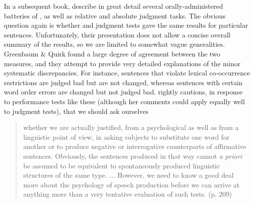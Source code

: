 In a subsequent book, \citet{GreenbaumEtAl1970} describe in great detail several orally-administered batteries of , as well as relative and
absolute judgment tasks. The obvious question again is whether  and judgment tests gave the same results for particular sentences. Unfortunately, their presentation does not allow a concise overall summary of the results, so we are limited to somewhat vague generalities. Greenbaum \& Quirk found a large degree of agreement between the two measures, and they attempt to provide very detailed explanations of the minor systematic discrepancies. For instance, sentences that violate lexical co-occurrence restrictions are judged bad but are not changed, whereas sentences with certain word order errors are changed but not judged bad. \citet{Tottie1977} rightly cautions, in response to performance tests like these (although her comments could apply equally well to judgment tests), that we should ask ourselves

\begin{quote}
whether we are actually justified, from a psychological  as well as from a linguistic point of view, in asking subjects to substitute one word for another or to produce negative or interrogative counterparts of affirmative sentences. Obviously, the sentences produced in that way cannot \textit{a priori} be assumed to be equivalent to spontaneously produced linguistic structures of the same type. ... However, we need to know a good deal more about the psychology of speech production before we can arrive at anything more than a very tentative evaluation of such tests. (p. 209)
\end{quote}

